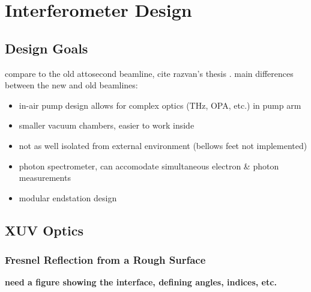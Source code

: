 \section{Interferometer Design}

\subsection{Design Goals}
compare to the old attosecond beamline, cite razvan's thesis \cite{chirlaAttosecondPulseGeneration2011}. main differences between the new and old beamlines:

\begin{itemize}
	\item in-air pump design allows for complex optics (THz, OPA, etc.) in pump arm
	\item smaller vacuum chambers, easier to work inside
	\item not as well isolated from external environment (bellows feet not implemented)
	\item photon spectrometer, can accomodate simultaneous electron \& photon measurements
	\item modular endstation design
\end{itemize}


\subsection{XUV Optics}

\subsubsection{Fresnel Reflection from a Rough Surface}

\textbf{need a figure showing the interface, defining angles, indices, etc.}

